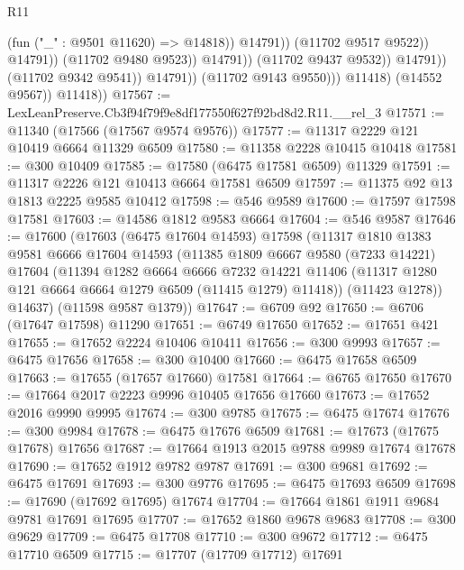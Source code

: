 \begin{lexlean}{R11}
\begin{coremodule}
                                              (fun ("_" : @9501 @11620) => @14818))
                                            @14791))
                                        (@11702 @9517 @9522))
                                      @14791))
                                  (@11702 @9480 @9523))
                                @14791))
                            (@11702 @9437 @9532))
                          @14791))
                      (@11702 @9342 @9541))
                    @14791))
                (@11702 @9143 @9550)))
            @11418)
          (@14552 @9567))
        @11418))
@17567 := LexLeanPreserve.Cb3f94f79f9e8df177550f627f92bd8d2.R11.__rel_3
@17571 := @11340 (@17566 (@17567 @9574 @9576))
@17577 := @11317 @2229 @121 @10419 @6664 @11329 @6509
@17580 := @11358 @2228 @10415 @10418
@17581 := @300 @10409
@17585 := @17580 (@6475 @17581 @6509) @11329
@17591 := @11317 @2226 @121 @10413 @6664 @17581 @6509
@17597 := @11375 @92 @13 @1813 @2225 @9585 @10412
@17598 := @546 @9589
@17600 := @17597 @17598 @17581
@17603 := @14586 @1812 @9583 @6664
@17604 := @546 @9587
@17646 := @17600
    (@17603
      (@6475 @17604 @14593)
      @17598
      (@11317
        @1810
        @1383
        @9581
        @6666
        @17604
        @14593
        (@11385
          @1809
          @6667
          @9580
          (@7233 @14221)
          @17604
          (@11394
            @1282
            @6664
            @6666
            @7232
            @14221
            @11406
            (@11317 @1280 @121 @6664 @6664 @1279 @6509 (@11415 @1279) @11418))
          (@11423 @1278))
        @14637)
      (@11598 @9587 @1379))
@17647 := @6709 @92
@17650 := @6706 (@17647 @17598) @11290
@17651 := @6749 @17650
@17652 := @17651 @421
@17655 := @17652 @2224 @10406 @10411
@17656 := @300 @9993
@17657 := @6475 @17656
@17658 := @300 @10400
@17660 := @6475 @17658 @6509
@17663 := @17655 (@17657 @17660) @17581
@17664 := @6765 @17650
@17670 := @17664 @2017 @2223 @9996 @10405 @17656 @17660
@17673 := @17652 @2016 @9990 @9995
@17674 := @300 @9785
@17675 := @6475 @17674
@17676 := @300 @9984
@17678 := @6475 @17676 @6509
@17681 := @17673 (@17675 @17678) @17656
@17687 := @17664 @1913 @2015 @9788 @9989 @17674 @17678
@17690 := @17652 @1912 @9782 @9787
@17691 := @300 @9681
@17692 := @6475 @17691
@17693 := @300 @9776
@17695 := @6475 @17693 @6509
@17698 := @17690 (@17692 @17695) @17674
@17704 := @17664 @1861 @1911 @9684 @9781 @17691 @17695
@17707 := @17652 @1860 @9678 @9683
@17708 := @300 @9629
@17709 := @6475 @17708
@17710 := @300 @9672
@17712 := @6475 @17710 @6509
@17715 := @17707 (@17709 @17712) @17691

\end{coremodule}
\end{lexlean}
